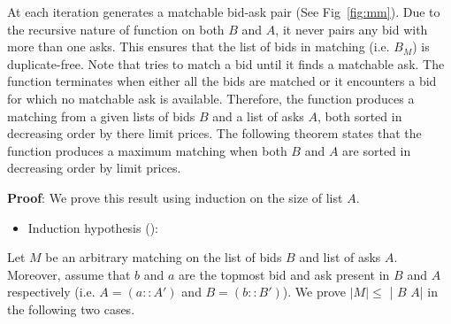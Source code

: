 \documentclass[a4paper,UKenglish,cleveref, autoref]{lipics-v2019}
\begin{document}
At each iteration   generates a matchable bid-ask pair (See Fig~\ref{fig:mm}). Due to the recursive nature of  function   on both $B$ and $A$, it never pairs any bid with more than one asks. This ensures that the list of bids in matching (i.e. $B_M$) is duplicate-free. Note that   tries to match a bid until it finds a matchable ask. The function terminates when either all the bids are matched or it encounters a bid for which no matchable ask is available.  Therefore, the function  produces a matching from a given lists of bids $B$ and a list of asks $A$, both sorted in decreasing order by there limit prices.  The following theorem states that the function  produces a maximum matching when both  $B$ and $A$ are sorted in decreasing order by limit prices.
\begin{theorem}
\end{theorem}
\textbf{Proof}: We prove this result using induction on the size of list $A$. 
\begin{itemize}
\item Induction hypothesis (): \emph{  }
\end{itemize}
Let $M$ be an arbitrary matching on the list of bids $B$ and list of asks $A$. Moreover, assume that $b$ and $a$ are the topmost bid and ask present in $B$ and $A$ respectively (i.e. $A = (a::A')$ and $B = (b::B')$). We prove $|M| \leq$ | $B$ $A$| in  the following two cases.
\end{document}
